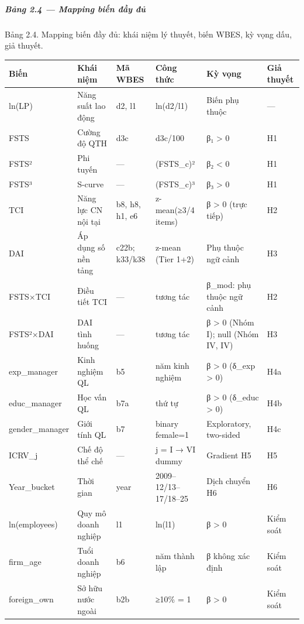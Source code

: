\documentclass[12pt,a4paper]{article}
\begin{document}
\hypertarget{bux1ea3ng-24--mapping-biux1ebfn-ux111ux1ea7y-ux111ux1ee7}{%
\subparagraph{Bảng 2.4 --- Mapping biến đầy
đủ}\label{bux1ea3ng-24--mapping-biux1ebfn-ux111ux1ea7y-ux111ux1ee7}}

Bảng 2.4. Mapping biến đầy đủ: khái niệm lý thuyết, biến WBES, kỳ vọng
dấu, giả thuyết.

\begin{longtable}[]{@{}llllll@{}}
\toprule\noalign{}
Biến & Khái niệm & Mã WBES & Công thức & Kỳ vọng & Giả thuyết \\
\midrule\noalign{}
\endhead
\bottomrule\noalign{}
\endlastfoot
ln(LP) & Năng suất lao động & d2, l1 & ln(d2/l1) & Biến phụ thuộc &
--- \\
FSTS & Cường độ QTH & d3c & d3c/100 & β₁ \textgreater{} 0 & H1 \\
FSTS² & Phi tuyến & --- & (FSTS\_c)² & β₂ \textless{} 0 & H1 \\
FSTS³ & S-curve & --- & (FSTS\_c)³ & β₃ \textgreater{} 0 & H1 \\
TCI & Năng lực CN nội tại & b8, h8, h1, e6 & z-mean(≥3/4 items) & β
\textgreater{} 0 (trực tiếp) & H2 \\
DAI & Áp dụng số nền tảng & c22b; k33/k38 & z-mean (Tier 1+2) & Phụ
thuộc ngữ cảnh & H3 \\
FSTS×TCI & Điều tiết TCI & --- & tương tác & β\_mod: phụ thuộc ngữ cảnh
& H2 \\
FSTS²×DAI & DAI tình huống & --- & tương tác & β \textgreater{} 0 (Nhóm
I); null (Nhóm IV, IV) & H3 \\
exp\_manager & Kinh nghiệm QL & b5 & năm kinh nghiệm & β \textgreater{}
0 (δ\_exp \textgreater{} 0) & H4a \\
educ\_manager & Học vấn QL & b7a & thứ tự & β \textgreater{} 0 (δ\_educ
\textgreater{} 0) & H4b \\
gender\_manager & Giới tính QL & b7 & binary female=1 & Exploratory,
two-sided & H4c \\
ICRV\_j & Chế độ thể chế & --- & j = I → VI dummy & Gradient H5 & H5 \\
Year\_bucket & Thời gian & year & 2009--12/13--17/18--25 & Dịch chuyển
H6 & H6 \\
ln(employees) & Quy mô doanh nghiệp & l1 & ln(l1) & β \textgreater{} 0 &
Kiểm soát \\
firm\_age & Tuổi doanh nghiệp & b6 & năm thành lập & β không xác định &
Kiểm soát \\
foreign\_own & Sở hữu nước ngoài & b2b & ≥10\% = 1 & β \textgreater{} 0
& Kiểm soát \\
\end{longtable}
\end{document}
